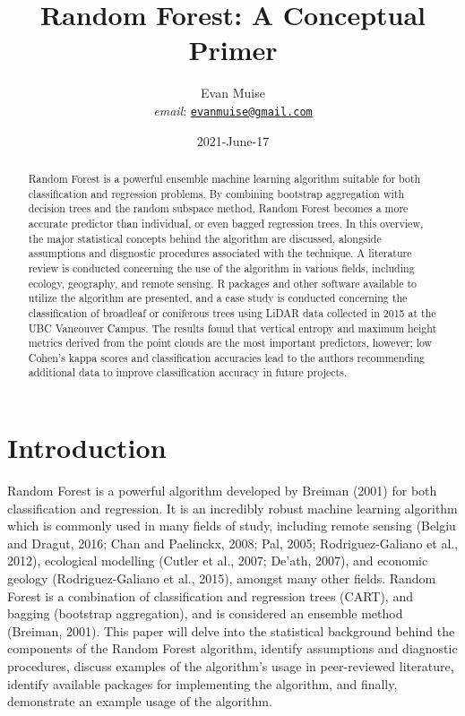 \documentclass[
]{article}
\title{Random Forest: A Conceptual Primer}
\author{Evan Muise\\
\emph{email}: \href{mailto:evanmuise@gmail.com}{\nolinkurl{evanmuise@gmail.com}}}
\date{2021-June-17}
\begin{document}
\maketitle
\begin{abstract}
Random Forest is a powerful ensemble machine learning algorithm suitable for both classification and regression problems. By combining bootstrap aggregation with decision trees and the random subspace method, Random Forest becomes a more accurate predictor than individual, or even bagged regression trees. In this overview, the major statistical concepts behind the algorithm are discussed, alongside assumptions and disgnostic procedures associated with the technique. A literature review is conducted concerning the use of the algorithm in various fields, including ecology, geography, and remote sensing. R packages and other software available to utilize the algorithm are presented, and a case study is conducted concerning the classification of broadleaf or coniferous trees using LiDAR data collected in 2015 at the UBC Vancouver Campus. The results found that vertical entropy and maximum height metrics derived from the point clouds are the most important predictors, however; low Cohen's kappa scores and classification accuracies lead to the authors recommending additional data to improve classification accuracy in future projects.
\end{abstract}

{
\setcounter{tocdepth}{2}
\tableofcontents
}
\newpage

\hypertarget{introduction}{%
\section{Introduction}\label{introduction}}

Random Forest is a powerful algorithm developed by Breiman (2001) for both classification and regression. It is an incredibly robust machine learning algorithm which is commonly used in many fields of study, including remote sensing (Belgiu and Dragut, 2016; Chan and Paelinckx, 2008; Pal, 2005; Rodriguez-Galiano et al., 2012), ecological modelling (Cutler et al., 2007; De'ath, 2007), and economic geology (Rodriguez-Galiano et al., 2015), amongst many other fields. Random Forest is a combination of classification and regression trees (CART), and bagging (bootstrap aggregation), and is considered an ensemble method (Breiman, 2001). This paper will delve into the statistical background behind the components of the Random Forest algorithm, identify assumptions and diagnostic procedures, discuss examples of the algorithm's usage in peer-reviewed literature, identify available packages for implementing the algorithm, and finally, demonstrate an example usage of the algorithm.
\end{document}
